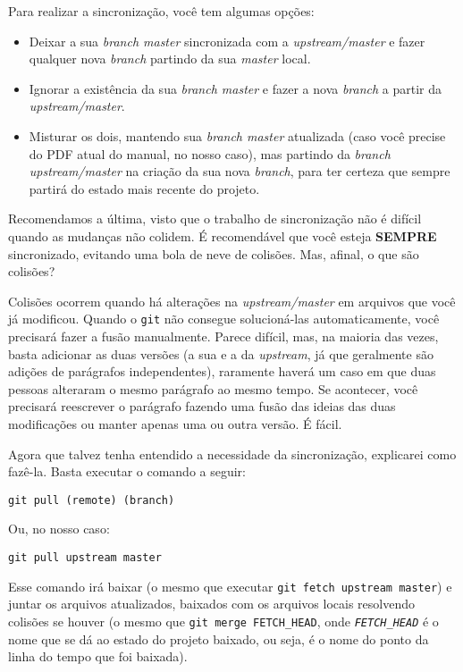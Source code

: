 \documentclass[a4paper,oneside,10pt]{memoir}
\begin{document}
Para realizar a sincronização, você tem algumas opções:

\begin{itemize}%
\item Deixar a sua \emph{branch master} sincronizada com a
  \emph{upstream/master} e fazer qualquer nova \emph{branch} partindo da sua
  \emph{master} local.
\item Ignorar a existência da sua \emph{branch master} e fazer a nova
  \emph{branch} a partir da \emph{upstream/master}.
\item Misturar os dois, mantendo sua \emph{branch master} atualizada (caso você
  precise do PDF atual do manual, no nosso caso), mas partindo da \emph{branch
  upstream/master} na criação da sua nova \emph{branch}, para ter certeza que
  sempre partirá do estado mais recente do projeto.
\end{itemize}

Recomendamos a última, visto que o trabalho de sincronização não é difícil
quando as mudanças não colidem. É recomendável que você esteja \textbf{SEMPRE}
sincronizado, evitando uma bola de neve de colisões. Mas, afinal, o que são
colisões?

Colisões ocorrem quando há alterações na \emph{upstream/master} em arquivos que
você já modificou. Quando o \texttt{git} não consegue solucioná-las
automaticamen\-te, você precisará fazer a fusão manualmente. Parece difícil,
mas, na maioria das vezes, basta adicionar as duas versões (a sua e a da
\emph{upstream}, já que geralmente são adições de parágrafos independentes),
raramente haverá um caso em que duas pessoas alteraram o mesmo parágrafo ao
mesmo tempo. Se acontecer, você precisará reescrever o parágrafo fazendo uma
fusão das ideias das duas modificações ou manter apenas uma ou outra versão. É
fácil.

Agora que talvez tenha entendido a necessidade da sincronização, explicarei
como fazê-la. Basta executar o comando a seguir:

\begin{center}
\texttt{git pull (remote) (branch)}
\end{center}

Ou, no nosso caso:

\begin{center}
\texttt{git pull upstream master}
\end{center}

Esse comando irá baixar (o mesmo que executar \texttt{git fetch upstream
mas\-ter}) e juntar os arquivos atualizados, baixados com os arquivos locais
resolvendo colisões se houver (o mesmo que \texttt{git merge FETCH\_HEAD}, onde
\emph{\texttt{FETCH\_\-HEAD}} é o nome que se dá ao estado do projeto baixado,
ou seja, é o nome do ponto da linha do tempo que foi baixada).
\end{document}
